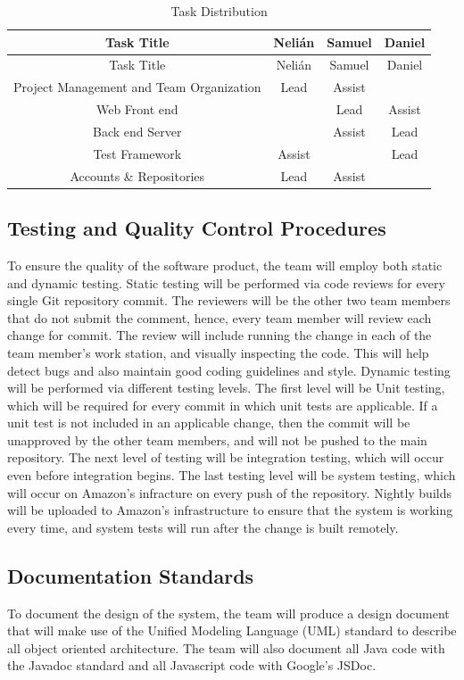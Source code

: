 \setlength{\extrarowheight}{1.5pt}
  \begin{longtable}{|c|c|c|c|}
 \caption{Task Distribution \label{tasks}} \\
   \hline
  
  \centering Task Title & Nelián & Samuel & Daniel \\
  \hline \hline \endfirsthead
  
     \hline

	\centering Task Title & Nelián & Samuel & Daniel \\  
	\hline \hline \endhead
  
  \endfoot  
  
  Project Management and Team Organization & Lead & Assist & \\ \hline
  Web Front end & & Lead & Assist \\ \hline
  Back end Server & & Assist & Lead \\ \hline
  Test Framework & Assist & & Lead \\ \hline
  Accounts \& Repositories & Lead & Assist &\\ \hline
   \end{longtable}
\subsection{Testing and Quality Control Procedures}

To ensure the quality of the software product, the team will employ both static
and dynamic testing. Static testing will be performed via code reviews for every
single Git repository commit. The reviewers will be the other two team members
that do not submit the comment, hence, every team member will review each change
for commit. The review will include running the change in each of the team
member's work station, and visually inspecting the code. This will help detect
bugs and also maintain good coding guidelines and style. Dynamic testing will be
performed via different testing levels. The first level will be Unit testing,
which will be required for every commit in which unit tests are applicable. If a
unit test is not included in an applicable change, then the commit will be
unapproved by the other team members, and will not be pushed to the main
repository. The next level of testing will be integration testing, which will
occur even before integration begins. The last testing level will be system
testing, which will occur on Amazon's infracture on every push of the
repository. Nightly builds will be uploaded to Amazon's infrastructure to ensure
that the system is working every time, and system tests will run after the
change is built remotely.

\subsection{Documentation Standards}

To document the design of the system, the team will produce a design document
that will make use of the Unified Modeling Language (UML) standard to describe
all object oriented architecture. The team will also document all Java code with
the Javadoc standard and all Javascript code with Google's JSDoc.

